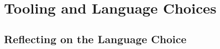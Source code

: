 
\section{Tooling and Language Choices} %
\label{sec:tooling_and_language_choices}

\subsection{Reflecting on the Language Choice} %
\label{sub:reflecting_on_the_language_choice}



